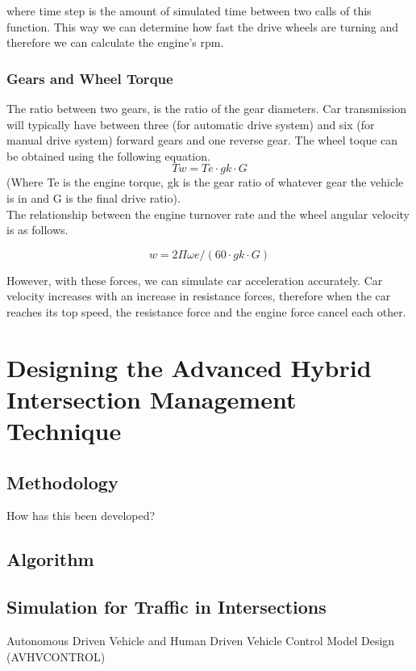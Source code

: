 \documentclass{book}
\begin{document}
where time step is the amount of simulated time between two calls of this function.  This way we can determine how fast the drive wheels are turning and therefore we can calculate the engine's rpm.

\subsection{Gears and Wheel Torque}
The ratio between two gears, is the ratio of the gear
diameters. Car transmission will typically have between three (for automatic drive system) and six (for manual drive system) forward gears and one reverse gear. The wheel toque can
be obtained using the following equation.
\begin{equation}
 Tw = Te  \cdot gk  \cdot G
\end{equation}
(Where Te is the engine torque, gk is the gear ratio of whatever gear the vehicle is
in and G is the final drive ratio).\\
The relationship between the engine turnover rate and the wheel angular
velocity is as follows.

\begin{equation}
w = 2\Pi \omega e / (60 \cdot gk \cdot G) %
\end{equation}


However, with these forces, we can simulate car acceleration accurately.
Car velocity increases with an increase in resistance forces, therefore when the car reaches its top speed, the resistance force and the engine force cancel each other.\



\chapter{Designing the Advanced Hybrid Intersection Management Technique}

\section{Methodology}

How has this been developed?

\section{Algorithm}

\section{Simulation for Traffic in Intersections}
Autonomous Driven Vehicle and Human Driven Vehicle Control Model Design (AVHVCONTROL)
\end{document}
